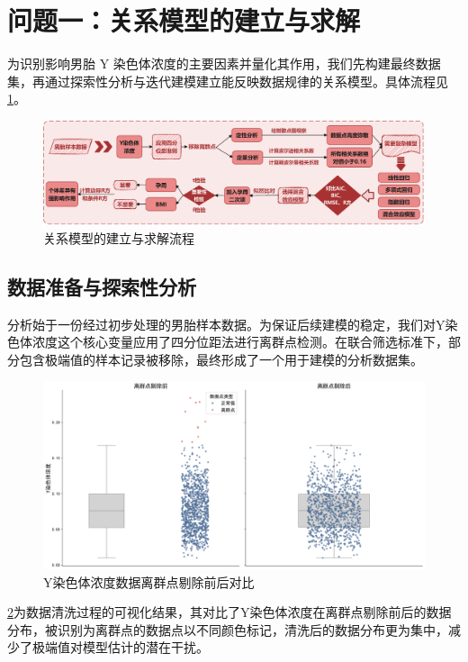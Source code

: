 \section{问题一：关系模型的建立与求解}
为识别影响男胎 Y 染色体浓度的主要因素并量化其作用，我们先构建最终数据集，再通过探索性分析与迭代建模建立能反映数据规律的关系模型。具体流程见 \cref{fig:关系模型的建立与求解流程}。

\begin{figure}[h!]
    \centering
    \includegraphics[width=\textwidth]{figs/3问题一/问题一.pdf}
    \caption{关系模型的建立与求解流程}
    \label{fig:关系模型的建立与求解流程}
\end{figure}

\subsection{数据准备与探索性分析}
分析始于一份经过初步处理的男胎样本数据。为保证后续建模的稳定，我们对Y染色体浓度这个核心变量应用了四分位距法进行离群点检测。在联合筛选标准下，部分包含极端值的样本记录被移除，最终形成了一个用于建模的分析数据集。

\begin{figure}[h!]
\centering
\includegraphics[width=\textwidth]{figs/3问题一/Y浓度离群点剔除可视化.png}
\caption{Y染色体浓度数据离群点剔除前后对比}
\label{fig:outlier_removal}
\end{figure}

\cref{fig:outlier_removal}为数据清洗过程的可视化结果，其对比了Y染色体浓度在离群点剔除前后的数据分布，被识别为离群点的数据点以不同颜色标记，清洗后的数据分布更为集中，减少了极端值对模型估计的潜在干扰。

